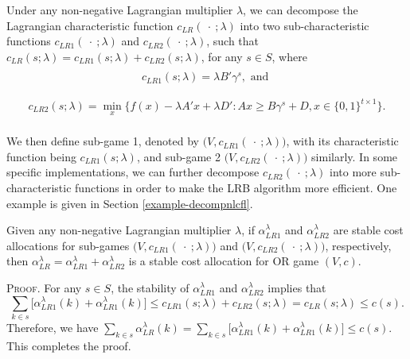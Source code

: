 \documentclass[ijoc,nonblindrev]{informs3} %
\begin{document}
Under any non-negative Lagrangian multiplier $\lambda$, we can decompose the Lagrangian characteristic function $c_{LR}(\ \cdot\ ;\lambda)$ into two sub-characteristic functions $c_{LR1}(\ \cdot\ ;\lambda)$ and $c_{LR2}(\ \cdot\ ;\lambda)$, such that $c_{LR}(s;\lambda) = c_{LR1}(s;\lambda) + c_{LR2}(s;\lambda)$, for any $s \in S$, where
\begin{eqnarray}\label{eqn:subcf1}
\begin{aligned}
\begin{split}
c_{LR1}(s;\lambda) = \lambda  B'\gamma^s, \mbox{ and }
\end{split}
\end{aligned}
\end{eqnarray}
 \begin{eqnarray}\label{eqn:subcf2}
\begin{aligned}
\begin{split}
c_{LR2}(s;\lambda) = \min_x \big\{ f(x)-\lambda A'x + \lambda D':Ax \geq B\gamma^s + D, x \in \{0,1\}^{t \times 1} \big\}.
\end{split}
\end{aligned}
\end{eqnarray}

We then define sub-game 1, denoted by $\big(V,c_{LR1}(\ \cdot\ ;\lambda)\big)$, with its characteristic function being $c_{LR1}(s;\lambda)$, and  sub-game 2  $\big(V, c_{LR2}(\ \cdot\ ;\lambda)\big)$ similarly. In some specific  implementations, we can  further decompose $c_{LR2}(\ \cdot\ ;\lambda)$ into more sub-characteristic functions in order to make the LRB algorithm more efficient. One example is given in Section \ref{example-decompnlcfl}.

\begin{theorem}\label{thm:lrcostallocationfeasible}
Given any non-negative Lagrangian multiplier $\lambda$, if $\alpha_{LR1}^{\lambda}$ and $\alpha_{LR2}^{\lambda}$ are stable cost allocations for  sub-games $\big(V,c_{LR1}(\ \cdot\ ;\lambda)\big)$ and $\big(V,c_{LR2}(\ \cdot\ ;\lambda)\big)$, respectively, then $\alpha_{LR}^{\lambda} = \alpha_{LR1}^{\lambda} + \alpha_{LR2}^{\lambda}$ is a stable cost allocation for OR game $(V,c)$.
\end{theorem}
{\scshape Proof.}
For any $s \in S$, the stability of $\alpha_{LR1}^{\lambda}$ and $\alpha_{LR2}^{\lambda}$ implies that
\begin{equation*}\label{eqn:feasibilitysgcost}
 \sum_{k \in s}\big[\alpha_{LR1}^{\lambda}(k) + \alpha_{LR1}^{\lambda}(k)\big] \leq c_{LR1}(s;\lambda) + c_{LR2}(s;\lambda) = c_{LR}(s;\lambda) \leq c(s).
\end{equation*}
Therefore, we have $\sum_{k \in s} \alpha_{LR}^{\lambda}(k) = \sum_{k \in s}\big[\alpha_{LR1}^{\lambda}(k) + \alpha_{LR1}^{\lambda}(k)\big] \leq c(s)$. This completes the proof.
\hfill\Halmos
\end{document}
